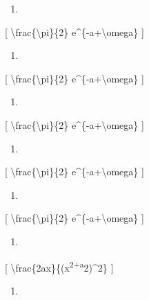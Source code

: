 \documentclass[
]{article}
\providecommand{\tightlist}{%
  \setlength{\itemsep}{0pt}\setlength{\parskip}{0pt}}
\begin{document}
{\begin{enumerate}
\def\labelenumi{\arabic{enumi}.}
\setcounter{enumi}{10}
\tightlist
\item
\end{enumerate}

{[} \textbackslash frac\{\textbackslash pi\}\{2\}
e\^{}\{-a+\textbackslash omega\} {]}

\begin{enumerate}
\def\labelenumi{\arabic{enumi}.}
\setcounter{enumi}{11}
\tightlist
\item
\end{enumerate}

{[} \textbackslash frac\{\textbackslash pi\}\{2\}
e\^{}\{-a+\textbackslash omega\} {]}

\begin{enumerate}
\def\labelenumi{\arabic{enumi}.}
\setcounter{enumi}{12}
\tightlist
\item
\end{enumerate}

{[} \textbackslash frac\{\textbackslash pi\}\{2\}
e\^{}\{-a+\textbackslash omega\} {]}

\begin{enumerate}
\def\labelenumi{\arabic{enumi}.}
\setcounter{enumi}{13}
\tightlist
\item
\end{enumerate}

{[} \textbackslash frac\{\textbackslash pi\}\{2\}
e\^{}\{-a+\textbackslash omega\} {]}

\begin{enumerate}
\def\labelenumi{\arabic{enumi}.}
\setcounter{enumi}{14}
\tightlist
\item
\end{enumerate}

{[} \textbackslash frac\{\textbackslash pi\}\{2\}
e\^{}\{-a+\textbackslash omega\} {]}

\begin{enumerate}
\def\labelenumi{\arabic{enumi}.}
\setcounter{enumi}{15}
\tightlist
\item
\end{enumerate}

{[} \textbackslash frac\{2ax\}\{(x\textsuperscript{2+a}2)\^{}2\} {]}

\begin{enumerate}
\def\labelenumi{\arabic{enumi}.}
\setcounter{enumi}{16}
\tightlist
\item
\end{enumerate}

}
\end{document}

